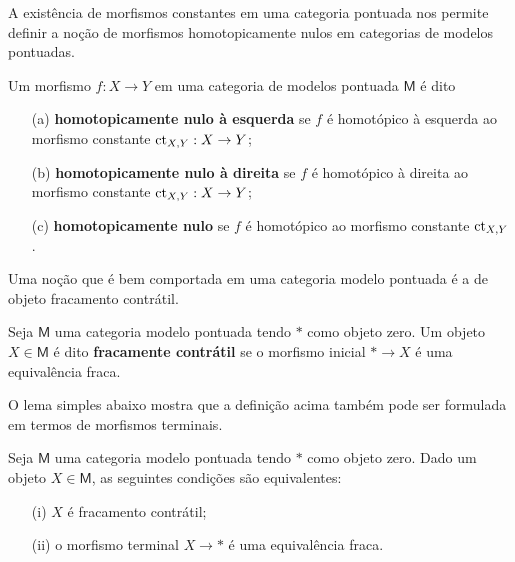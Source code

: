 A existência de morfismos constantes em uma categoria pontuada nos permite definir a noção de morfismos homotopicamente nulos em categorias de modelos pontuadas.

\begin{defin}
  Um morfismo $f: X \to Y$ em uma categoria de modelos pontuada $\mathsf{M}$ é dito
  \begin{enumerate}
  \item[(a)] \textbf{homotopicamente nulo à esquerda} se $f$ é homotópico à esquerda ao morfismo constante $\mathrm{ct}_{X,Y}: X \to Y$;
    
  \item[(b)] \textbf{homotopicamente nulo à direita} se $f$ é homotópico à direita ao morfismo constante $\mathrm{ct}_{X,Y}: X \to Y$;
    
  \item[(c)] \textbf{homotopicamente nulo} se $f$ é homotópico ao morfismo constante $\mathrm{ct}_{X,Y}$.
  \end{enumerate}
\end{defin}

Uma noção que é bem comportada em uma categoria modelo pontuada é a de objeto fracamento contrátil.

\begin{defin}\label{defin:objeto_fracamente_contratil}
  Seja $\mathsf{M}$ uma categoria modelo pontuada tendo $*$ como objeto zero.
  Um objeto $X \in \mathsf{M}$ é dito \textbf{fracamente contrátil} se o morfismo inicial $* \to X$ é uma equivalência fraca.
\end{defin}

O lema simples abaixo mostra que a definição acima também pode ser formulada em termos de morfismos terminais.

\begin{lema}\label{lema:fracamente_contratil_sse_morfismo_terminal_eh_equiv_fraca}
  Seja $\mathsf{M}$ uma categoria modelo pontuada tendo $*$ como objeto zero.
  Dado um objeto $X \in \mathsf{M}$, as seguintes condições são equivalentes:
  \begin{enumerate}
  \item[(i)] $X$ é fracamento contrátil;
    
  \item[(ii)] o morfismo terminal $X \to *$ é uma equivalência fraca.
  \end{enumerate}
\end{lema}


